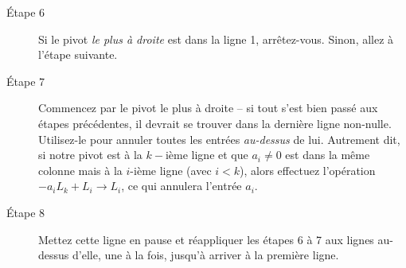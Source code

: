\begin{description}
\item[Étape 6] Si le pivot {\it le plus à droite} est dans la ligne 1, arrêtez-vous. Sinon, allez \`a l'\'etape suivante.
\item[Étape 7] Commencez par le pivot le plus à droite -- si tout s'est bien passé aux étapes précédentes, il devrait se trouver dans la dernière ligne non-nulle.  Utilisez-le pour annuler toutes les entrées {\it au-dessus} de lui. Autrement dit, si notre pivot est \`a la $k-$i\`eme ligne et que $a_i\not=0$ est dans la même colonne mais à la $i$-ième ligne (avec $i<k$),
alors effectuez l'op\'eration $-a_iL_k+L_i \to L_i$, ce qui annulera l'entrée $a_i$. 
\item[Étape 8] Mettez cette ligne en pause et r\'eappliquer les étapes 6 \`a 7 aux lignes au-dessus d'elle, une \`a la fois, jusqu'à arriver à la première ligne.\\
\end{description}


